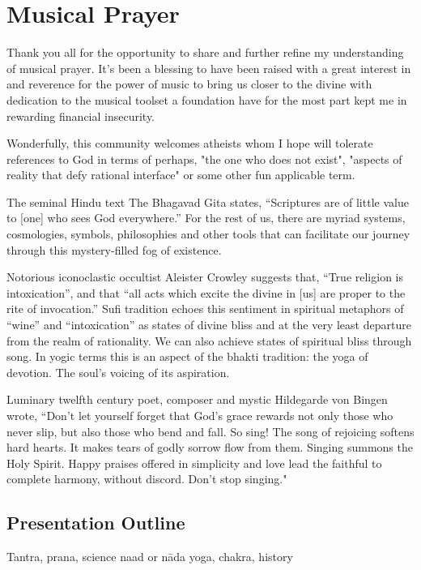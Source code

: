 \documentclass[12pt]{article}
\begin{document}
\section*{Musical Prayer}

Thank you all for  the opportunity to share and further refine my understanding of musical prayer. It's been a blessing to have been raised with a great interest in and reverence for the power of music to bring us closer to the divine with dedication to the musical toolset a foundation have for the most part kept me in rewarding financial insecurity.

Wonderfully, this community welcomes atheists whom I hope will tolerate references to God in terms of perhaps, "the one who does not exist", "aspects of reality that defy rational interface" or some other fun applicable term.

The seminal Hindu text The Bhagavad Gita states, “Scriptures are of little value to [one] who sees God everywhere.” For the rest of us, there are myriad systems, cosmologies, symbols, philosophies and other tools that can facilitate our journey through this mystery-filled fog of existence.

Notorious iconoclastic occultist Aleister Crowley suggests that, “True religion is intoxication”, and that “all acts which excite the divine in [us] are proper to the rite of invocation.” Sufi tradition echoes this sentiment in spiritual metaphors of “wine” and “intoxication” as states of divine bliss and at the very least departure from the realm of rationality. We can also achieve states of spiritual bliss through song. In yogic terms this is an aspect of the bhakti tradition: the yoga of devotion. The soul’s voicing of its aspiration.

Luminary twelfth century poet, composer and mystic Hildegarde von Bingen wrote, “Don't let yourself forget that God's grace rewards not only those who never slip, but also those who bend and fall. So sing! The song of rejoicing softens hard hearts. It makes tears of godly sorrow flow from them. Singing summons the Holy Spirit. Happy praises offered in simplicity and love lead the faithful to complete harmony, without discord. Don't stop singing."

\subsection*{Presentation Outline}

Tantra, prana, science naad or nāda yoga, chakra, history
\end{document}
